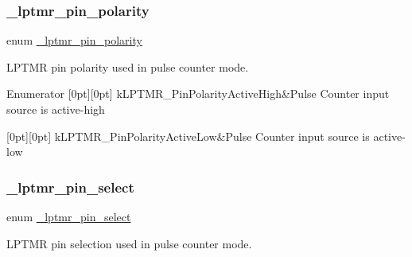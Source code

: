 \subsubsection{\texorpdfstring{\_lptmr\_pin\_polarity}{\_lptmr\_pin\_polarity}}
{\footnotesize\ttfamily enum \mbox{\hyperlink{group__lptmr_ga9bd2404c984ac5eea420a396e7cdda77}{\+\_\+lptmr\+\_\+pin\+\_\+polarity}}}



L\+P\+T\+MR pin polarity used in pulse counter mode. 

\begin{DoxyEnumFields}{Enumerator}
[0pt][0pt]{}\mbox{\label{group__lptmr_gga9bd2404c984ac5eea420a396e7cdda77a2f387787b10172f719dbc304573fc0c6}} 
k\+L\+P\+T\+M\+R\+\_\+\+Pin\+Polarity\+Active\+High&Pulse Counter input source is active-\/high \\
\hline

[0pt][0pt]{}\mbox{\label{group__lptmr_gga9bd2404c984ac5eea420a396e7cdda77aa083f88b878d9781b91cdf5a7cbc5fe1}} 
k\+L\+P\+T\+M\+R\+\_\+\+Pin\+Polarity\+Active\+Low&Pulse Counter input source is active-\/low \\
\hline

\end{DoxyEnumFields}
\mbox{\label{group__lptmr_gad7812eb27238f5bd2cb3edc40d5f25ed}} 
\subsubsection{\texorpdfstring{\_lptmr\_pin\_select}{\_lptmr\_pin\_select}}
{\footnotesize\ttfamily enum \mbox{\hyperlink{group__lptmr_gad7812eb27238f5bd2cb3edc40d5f25ed}{\+\_\+lptmr\+\_\+pin\+\_\+select}}}



L\+P\+T\+MR pin selection used in pulse counter mode. 

